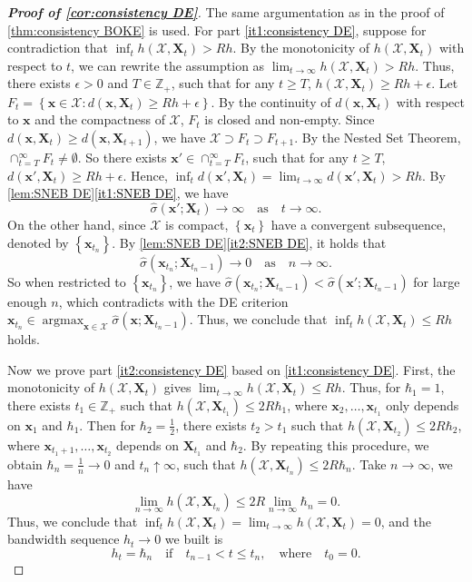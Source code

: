 \documentclass[11pt,en]{elegantpaper}
\newcommand{\domain}{\mathcal{X}}
\newcommand{\X}{\bm{X}}
\newcommand{\x}{\bm{x}}
\newcommand{\1}{\mathds{1}}
\newcommand{\set}[1]{\left\{#1\right\}}
\DeclareMathOperator*{\argmax}{argmax}
\newcommand{\itref}[1]{\hyperref[#1]{\textcolor{black}{\ref*{#1}}}}
\begin{document}
\begin{proof}[\rm\bfseries Proof of \cref{cor:consistency DE}]
    The same argumentation as in the proof of \cref{thm:consistency BOKE} is used.
    For part \itref{it1:consistency DE}, suppose for contradiction that $\inf_{t} h(\domain, \X_t) > R h$. By the monotonicity of $h(\domain, \X_t)$ with respect to $t$, we can rewrite the assumption as $\lim_{t \to \infty} h(\domain, \X_t) > Rh$. Thus, there exists $\epsilon > 0$ and $T \in \mathbb{Z}_+$, such that for any $t \ge T$, $h(\domain, \X_t) \ge Rh + \epsilon$. Let $F_t = \set{\x \in \domain : d(\x, \X_t) \ge Rh + \epsilon}$. By the continuity of $d(\x, \X_t)$ with respect to $\x$ and the compactness of $\domain$, $F_t$ is closed and non-empty. Since $d(\x, \X_t) \ge d(\x, \X_{t+1})$, we have $\domain \supset F_t \supset F_{t+1}$. By the Nested Set Theorem, $\cap_{t=T}^{\infty} F_t \neq \emptyset$. So there exists $\x' \in \cap_{t=T}^{\infty} F_t$, such that for any $t \ge T$, $d(\x', \X_t) \ge Rh + \epsilon$. Hence, $\inf_t d(\x', \X_t) = \lim_{t \to \infty} d(\x', \X_t) > Rh$. By \cref{lem:SNEB DE}\itref{it1:SNEB DE}, we have
    \[
        \widehat{\sigma}(\x'; \X_t) \to \infty \quad \text{as} \quad t \to \infty.
    \]
    On the other hand, since $\domain$ is compact, $\set{ \x_t }$ have a convergent subsequence, denoted by $\set{ \x_{t_n} }$. By \cref{lem:SNEB DE}\itref{it2:SNEB DE}, it holds that
    \[
        \widehat{\sigma}(\x_{t_n}; \X_{t_n - 1}) \to 0 \quad \text{as} \quad n \to \infty.
    \]
    So when restricted to $\set{\x_{t_n}}$, we have $\widehat{\sigma}(\x_{t_n}; \X_{t_n - 1}) < \widehat{\sigma}(\x'; \X_{t_n - 1})$ for large enough $n$, which contradicts with the DE criterion $\x_{t_n} \in \argmax_{\x \in \domain} \widehat{\sigma}(\x; \X_{t_n - 1})$. Thus, we conclude that $\inf_{t} h(\domain, \X_t) \le R h$ holds.

    Now we prove part \itref{it2:consistency DE} based on \itref{it1:consistency DE}. First, the monotonicity of $h(\domain, \X_t)$ gives $\lim_{t \to \infty} h(\domain, \X_t) \le R h$. Thus, for $\hbar_1 = 1$, there exists $t_1 \in \mathbb{Z}_+$ such that $h(\domain, \X_{t_1}) \le 2 R \hbar_1$, where $\x_2, \dots, \x_{t_1}$ only depends on $\x_1$ and $\hbar_1$. Then for $\hbar_2 = \frac{1}{2}$, there exists $t_2 > t_1$ such that $h(\domain, \X_{t_2}) \le 2 R \hbar_2$, where $\x_{t_1 + 1}, \dots, \x_{t_2}$ depends on $\X_{t_1}$ and $\hbar_2$. By repeating this procedure, we obtain $\hbar_n = \frac{1}{n} \to 0$ and $t_n \uparrow \infty$, such that $h(\domain, \X_{t_n}) \le 2 R \hbar_n$. Take $n \to \infty$, we have
    \[
        \lim_{n \to \infty} h(\domain, \X_{t_n}) \le 2 R \lim_{n \to \infty} \hbar_n = 0.
    \]
    Thus, we conclude that $\inf_t h(\domain, \X_t) = \lim_{t \to \infty} h(\domain, \X_t) = 0$, and the bandwidth sequence $h_t \to 0$ we built is
    \[
        h_t = \hbar_n \quad \text{if} \quad t_{n-1} < t \le t_n, \quad \text{where} \quad t_0 = 0.
    \]
\end{proof}
\end{document}

